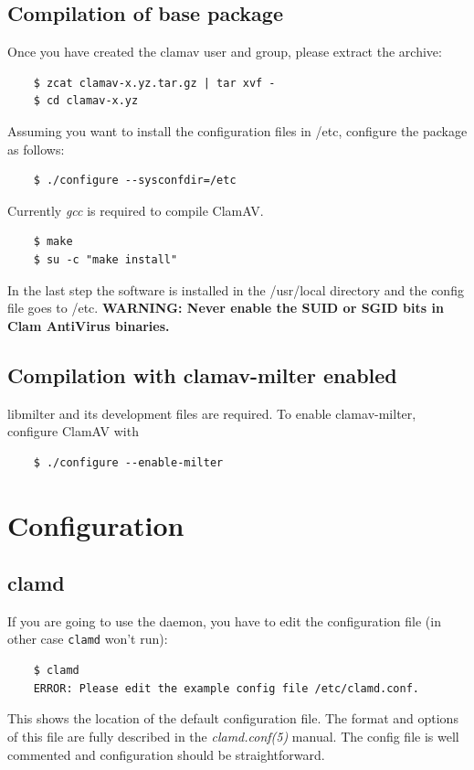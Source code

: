 \documentclass[a4paper,titlepage,12pt]{article}
\begin{document}
    \subsection{Compilation of base package}
    Once you have created the clamav user and group, please extract the archive:
    \begin{verbatim}
	$ zcat clamav-x.yz.tar.gz | tar xvf -
	$ cd clamav-x.yz
    \end{verbatim}
    Assuming you want to install the configuration files in /etc, configure
    the package as follows:
    \begin{verbatim}
	$ ./configure --sysconfdir=/etc
    \end{verbatim}
    Currently \emph{gcc} is required to compile ClamAV.
    \begin{verbatim}
	$ make
	$ su -c "make install"
    \end{verbatim}
    In the last step the software is installed in the /usr/local directory
    and the config file goes to /etc. \textbf{WARNING: Never enable the SUID
    or SGID bits in Clam AntiVirus binaries.}

    \subsection{Compilation with clamav-milter enabled}
    libmilter and its development files are required. To enable clamav-milter,
    configure ClamAV with
    \begin{verbatim}
	$ ./configure --enable-milter
    \end{verbatim}

    \section{Configuration}

    \subsection{clamd}
    If you are going to use the daemon, you have to edit the configuration file
    (in other case \verb+clamd+ won't run):
    \begin{verbatim}
	$ clamd
	ERROR: Please edit the example config file /etc/clamd.conf.
    \end{verbatim}
    This shows the location of the default configuration file. The format and
    options of this file are fully described in the \emph{clamd.conf(5)}
    manual. The config file is well commented and configuration should be
    straightforward.
\end{document}
